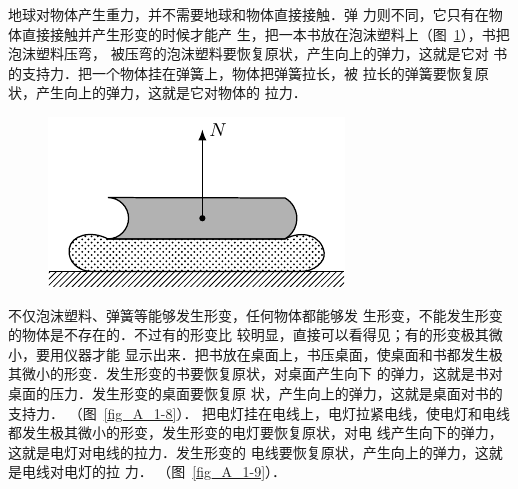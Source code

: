     地球对物体产生重力，并不需要地球和物体直接接触．弹
力则不同，它只有在物体直接接触并产生形变的时候才能产
生，把一本书放在泡沫塑料上（图~\ref{fig_A_1-7}），书把泡沫塑料压弯，
被压弯的泡沫塑料要恢复原状，产生向上的弹力，这就是它对
书的支持力．把一个物体挂在弹簧上，物体把弹簧拉长，被
拉长的弹簧要恢复原状，产生向上的弹力，这就是它对物体的
拉力．
\begin{figure}[htbp]
    \centering
    \includegraphics{fig/A/1-7.pdf} 
    \caption{} \label{fig_A_1-7} 
\end{figure} 

    不仅泡沫塑料、弹簧等能够发生形变，任何物体都能够发
生形变，不能发生形变的物体是不存在的．不过有的形变比
较明显，直接可以看得见；有的形变极其微小，要用仪器才能
显示出来．把书放在桌面上，书压桌面，使桌面和书都发生极
其微小的形变．发生形变的书要恢复原状，对桌面产生向下
的弹力，这就是书对桌面的压力．发生形变的桌面要恢复原
状，产生向上的弹力，这就是桌面对书的支持力． （图~\ref{fig_A_1-8}）．
把电灯挂在电线上，电灯拉紧电线，使电灯和电线
都发生极其微小的形变，发生形变的电灯要恢复原状，对电
线产生向下的弹力，这就是电灯对电线的拉力．发生形变的
电线要恢复原状，产生向上的弹力，这就是电线对电灯的拉
力． （图~\ref{fig_A_1-9}）．


